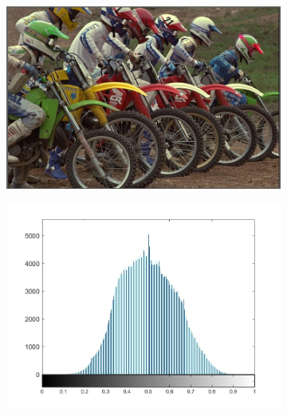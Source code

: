 \begin{figure}
     \centering
     \begin{subfigure}[b]{0.23\textwidth}
         \centering
         \includegraphics[width=\textwidth]{./figs/reference}
         \caption{}
         \label{fig:nss1}
     \end{subfigure}
     \begin{subfigure}[b]{0.23\textwidth}
         \centering
         \includegraphics[width=\textwidth]{./figs/mscn_histreference}
         \caption{}
         \label{fig:nss2}
     \end{subfigure}
     \begin{subfigure}[b]{0.23\textwidth}
         \centering

\end{subfigure}
\end{figure}
